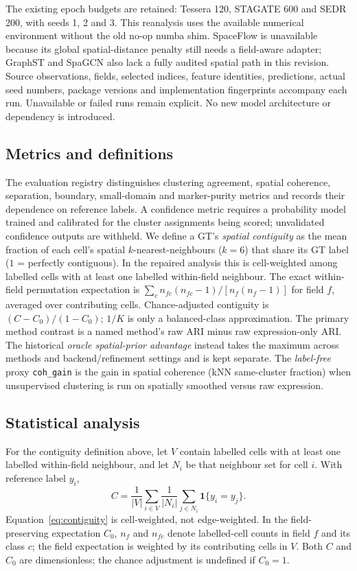 \documentclass[journal]{IEEEtran}
\begin{document}
The existing epoch budgets are retained: Tessera 120, STAGATE 600 and SEDR 200, with seeds 1, 2 and 3. This reanalysis uses the available numerical environment without the old no-op numba shim. SpaceFlow is unavailable because its global spatial-distance penalty still needs a field-aware adapter; GraphST and SpaGCN also lack a fully audited spatial path in this revision. Source observations, fields, selected indices, feature identities, predictions, actual seed numbers, package versions and implementation fingerprints accompany each run. Unavailable or failed runs remain explicit. No new model architecture or dependency is introduced.

\subsection{Metrics and definitions}
The evaluation registry distinguishes clustering agreement, spatial coherence, separation, boundary, small-domain and marker-purity metrics and records their dependence on reference labels. A confidence metric requires a probability model trained and calibrated for the cluster assignments being scored; unvalidated confidence outputs are withheld. We define a GT's \emph{spatial contiguity} as the mean fraction of each
cell's spatial $k$-nearest-neighbours ($k{=}6$) that share its GT label ($1$ = perfectly contiguous). In the repaired analysis this is cell-weighted among labelled cells with at least one labelled within-field neighbour. The exact within-field permutation expectation is $\sum_c n_{fc}(n_{fc}-1)/[n_f(n_f-1)]$ for field $f$, averaged over contributing cells. Chance-adjusted contiguity is $(C-C_0)/(1-C_0)$; $1/K$ is only a balanced-class approximation. The primary method contrast is a named method's raw ARI minus raw expression-only ARI. The historical \emph{oracle spatial-prior advantage} instead takes the maximum across methods and backend/refinement settings and is kept separate. The \emph{label-free} proxy \texttt{coh\_gain} is the gain
in spatial coherence (kNN same-cluster fraction) when unsupervised clustering is run on spatially smoothed
versus raw expression.

\subsection{Statistical analysis}
For the contiguity definition above, let $V$ contain labelled cells with at
least one labelled within-field neighbour, and let $N_i$ be that neighbour
set for cell $i$. With reference label $y_i$,
\begin{equation}\label{eq:contiguity}
C=\frac{1}{|V|}\sum_{i\in V}\frac{1}{|N_i|}
\sum_{j\in N_i}\mathbf{1}\{y_i=y_j\}.
\end{equation}
Equation~\ref{eq:contiguity} is cell-weighted, not edge-weighted. In the
field-preserving expectation $C_0$, $n_f$ and $n_{fc}$ denote labelled-cell
counts in field $f$ and its class $c$; the field expectation is weighted
by its contributing cells in $V$. Both $C$ and $C_0$ are dimensionless;
the chance adjustment is undefined if $C_0=1$.
\end{document}
